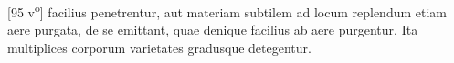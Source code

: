 [95 v\textsuperscript{o}]  facilius penetrentur, aut materiam\protect{}  subtilem ad locum  replendum etiam aere purgata, de se emittant, quae  denique facilius ab aere purgentur. Ita multiplices corporum varietates gradusque detegentur.\pend 
